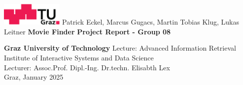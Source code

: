 \documentclass[../main.tex]{subfiles}
\begin{document}
\begin{titlepage}
	{\sffamily
		\begin{center}
			\includegraphics[width=30mm]{figures/TU_Graz_Logo}
			\vfill\vfill\vfill
			\vfill\vfill\vfill
			    {   Patrick Eckel,
                    Marcus Gugacs,
                    Martin Tobias Klug,
                    Lukas Leitner
                }
			\vfill\vfill\vfill
			    {\LARGE\bfseries Movie Finder}
			\vfill\vfill\vfill
			\vfill\vfill\vfill
			    {\bfseries\large Project Report - Group 08 }
			\vfill\vfill\vfill

			\vfill
			    {\bfseries\large Graz University of Technology}
			\vfill\vfill\vfill
    			Lecture:
    			{Advanced Information Retrieval}
			\vfill
    			{Institute of Interactive Systems and Data Science}\\
    			Lecturer: Assoc.Prof. Dipl.-Ing. Dr.techn. Elisabth Lex \\
			\vfill
			\vfill\vfill\vfill
			    Graz, January 2025
		\end{center}
	}
\end{titlepage}
\end{document}
